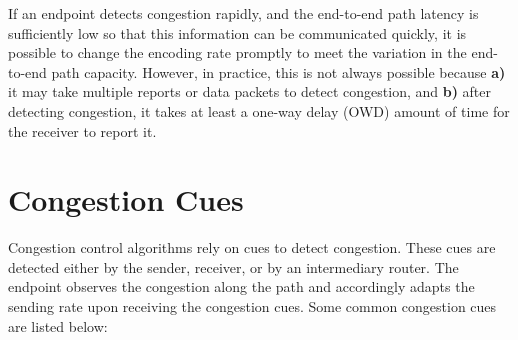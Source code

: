 If an endpoint detects congestion rapidly, and the end-to-end path latency is
sufficiently low so that this information can be communicated quickly, it is
possible to change the encoding rate promptly to meet the variation in the
end-to-end path capacity. However, in practice, this is not always possible because
\textbf{a)} it may take multiple reports or data packets to detect congestion, and
\textbf{b)} after detecting congestion, it takes at least a one-way delay (OWD)
amount of time for the receiver to report it.


\section{Congestion Cues}
\label{fw.cues}

Congestion control algorithms rely on cues to detect congestion. These cues
are detected either by the sender, receiver, or by an intermediary router. The
endpoint observes the congestion along the path and accordingly adapts the
sending rate upon receiving the congestion cues.
Some common congestion cues are listed below:

